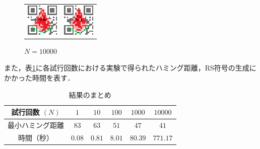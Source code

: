 \documentclass{thesis}
\begin{document}
\begin{figure}[H]
  \begin{tabular}{cc}
    \begin{minipage}[t]{0.45\hsize}
     \centering
      \includegraphics[width=0.5\linewidth]{pic/Tahara_1000_38.eps}
      \caption{$N=1000$}
      \label{fig:output_1000}
    \end{minipage} &
    \begin{minipage}[t]{0.45\hsize}
     \centering
      \includegraphics[width=0.5\linewidth]{pic/Tahara_10000_34.eps}
       \caption{$N=10000$}
      \label{fig:output_10000}
      \end{minipage}
  \end{tabular}
\end{figure}
    

また，表\ref{summary}に各試行回数における実験で得られたハミング距離，RS符号の生成にかかった時間を表す．

\begin{table}[H]
	\caption{結果のまとめ}
	\begin{center}
  		\begin{tabular}{|c|c|c|c|c|c|} \hline
     		試行回数 $(N) $&  $1$ & $10$ & $100$ & $1000$ & $10000$  \\  \hline
   			最小ハミング距離 &  $83$ & $63$ & $51$ & $47$ & $41$\\ \hline
			時間（秒） &  $0.08$ & $0.81$ & $8.01$ & $80.39$ & $771.17$\\ \hline
     		\end{tabular}
  	\end{center}
  \label{summary}
\end{table}
\end{document}
